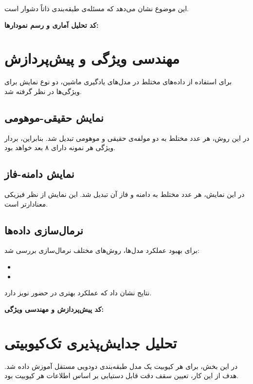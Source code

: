 این موضوع نشان می‌دهد که مسئله‌ی طبقه‌بندی ذاتاً دشوار است.

\textbf{کد تحلیل آماری و رسم نمودارها:}


\section{مهندسی ویژگی و پیش‌پردازش}

برای استفاده از داده‌های مختلط در مدل‌های یادگیری ماشین، دو نوع نمایش برای ویژگی‌ها در نظر گرفته شد.

\subsection{نمایش حقیقی-موهومی}
در این روش، هر عدد مختلط به دو مولفه‌ی حقیقی و موهومی تبدیل شد. بنابراین، بردار ویژگی هر نمونه دارای ۸ بعد خواهد بود.

\subsection{نمایش دامنه-فاز}
در این نمایش، هر عدد مختلط به دامنه و فاز آن تبدیل شد. این نمایش از نظر فیزیکی معنادارتر است.

\subsection{نرمال‌سازی داده‌ها}
برای بهبود عملکرد مدل‌ها، روش‌های مختلف نرمال‌سازی بررسی شد:
\begin{itemize}
	\item {}
	\item {}
\end{itemize}

نتایج نشان داد که  عملکرد بهتری در حضور نویز دارد.

\textbf{کد پیش‌پردازش و مهندسی ویژگی:}


\section{تحلیل جدایش‌پذیری تک‌کیوبیتی}

در این بخش، برای هر کیوبیت یک مدل طبقه‌بندی دودویی مستقل آموزش داده شد. هدف از این کار، تعیین سقف دقت قابل دستیابی بر اساس اطلاعات هر کیوبیت بود.

